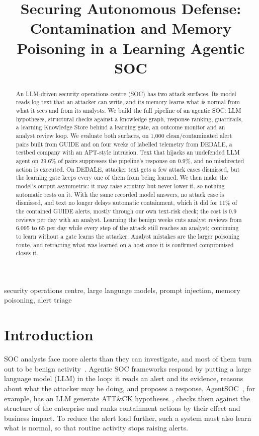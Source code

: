 \documentclass[conference]{IEEEtran}
\newcommand{\todo}[1]{\textcolor{red}{[TODO: #1]}}
\begin{document}
\title{Securing Autonomous Defense: Contamination and Memory Poisoning in a Learning Agentic SOC}

\author{\IEEEauthorblockN{\todo{authors (team)}}}

\maketitle

\begin{abstract}
An LLM-driven security operations centre (SOC) has two attack surfaces. Its model reads log text that an attacker
can write, and its memory learns what is normal from what it sees and from its analysts. We build the full pipeline
of an agentic SOC: LLM hypotheses, structural checks against a knowledge graph, response ranking, guardrails, a
learning Knowledge Store behind a learning gate, an outcome monitor and an analyst review loop. We evaluate both
surfaces, on 1,000 clean/contaminated alert pairs built from GUIDE and on four weeks of labelled telemetry from
DEDALE, a testbed company with an APT-style intrusion.
Text that hijacks an undefended LLM agent on 29.6\% of pairs suppresses the pipeline's response on 0.9\%, and no
misdirected action is executed. On DEDALE, attacker text gets a few attack cases dismissed, but the learning
gate keeps every one of them from being learned. We then make the model's output asymmetric: it may raise scrutiny
but never lower it, so nothing automatic rests on it. With the same recorded model answers, no attack case is
dismissed, and text no longer delays automatic containment, which it did for 11\% of the contained GUIDE alerts,
mostly through our own text-risk check; the cost is 0.9 reviews per day with an analyst. Learning the benign weeks
cuts analyst reviews from 6,095 to 65 per day while every step of the attack still reaches an analyst; continuing
to learn without a gate learns the attacker. Analyst mistakes are the larger poisoning route,
and retracting what was learned on a host once it is confirmed compromised closes it.
\end{abstract}

\begin{IEEEkeywords}
security operations centre, large language models, prompt injection, memory poisoning, alert triage
\end{IEEEkeywords}

\section{Introduction}
SOC analysts face more alerts than they can investigate, and most of them turn out to be benign
activity~\cite{alahmadi}. Agentic SOC frameworks respond by putting a large language model (LLM) in the loop: it
reads an alert and its evidence, reasons about what the attacker may be doing, and proposes a response.
AgentSOC~\cite{agentsoc}, for example, has an LLM generate ATT\&CK hypotheses~\cite{attack}, checks them against
the structure of the enterprise and ranks containment actions by their effect and business impact. To reduce the
alert load further, such a system must also learn what is normal, so that routine activity stops raising alerts.
\end{document}
